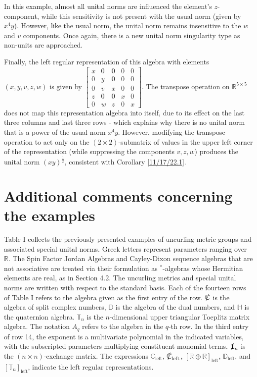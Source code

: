 \documentclass{amsart}
\numberwithin{equation}{section}
\theoremstyle{definition}
\numberwithin{theorem}{section}
\begin{document}
In this example, almost all unital norms are influenced the element's $z$-component, while this sensitivity is not present with the usual norm (given by $x^4y$).  However, like the usual norm,  the unital norm remains insensitive to the $w$ and $v$ components.  Once again, there is a new unital norm singularity type as non-units are approached.  

Finally, the left regular representation of this algebra with elements $(x,y,v,z,w)$ is given by $ \left[
\begin{array}{ccccc}
x & 0 & 0 & 0 & 0   \\
0 & y & 0 & 0 & 0 \\
0 & v &  x & 0 & 0  \\
z & 0 &  0 & x & 0  \\
0 & w &  z & 0 & x
\end{array}
\right].$
The transpose operation on $\mathbb{R}^{5\times 5}$ does not map this representation algebra into itself, due to its effect on the last three columns and last three rows - which explains why there is no unital norm that is a power of the usual norm $x^4y$.  However, modifying the transpose operation to act only on the $(2\times 2)$-submatrix of values in the upper left corner of the representation (while suppressing the components $v,z,w$) produces the unital norm $(xy)^\frac{1}{2}$, consistent with Corollary \ref{11/17/22.1}.
 
\section{Additional comments concerning the examples}

Table I collects the previously presented examples of uncurling metric groups and associated special unital norms.  Greek letters represent parameters ranging over $\mathbb{R}$.  The Spin Factor Jordan Algebras and Cayley-Dixon sequence algebras that are not associative are treated via their formulation as $^*$-algebras whose Hermitian elements are real, as in Section 4.2. The uncurling metrics and special unital norms are written with respect to the standard basis.  Each of the fourteen rows of Table I refers to the algebra given as the first entry of the row.  $\slashed{\mathbb{C}}$ is the algebra of split complex numbers, $\mathbb{D}$ is the algebra of the dual numbers, and $\mathbb{H}$ is the quaternion algebra.  $\mathbb{T}_n$ is the $n$-dimensional upper triangular Toeplitz matrix algebra.  The notation $A_q$ refers to the algebra in the $q$-th row.  In the third entry of row 14, the exponent is a multivariate polynomial in the indicated variables, with the subscripted parameters multiplying constituent monomial terms.  $\slashed{\mathbf{1}}_n$ is the $(n\times n)$-exchange matrix.  The expressions $\mathbb{C}_\text{left}$, $\slashed{\mathbb{C}}_\text{left}$, $[\mathbb{R}\oplus\mathbb{R}]_\text{left}$, $\mathbb{D}_\text{left}$, and $[\mathbb{T}_n]_\text{left}$, indicate the left regular representations.
\end{document}
